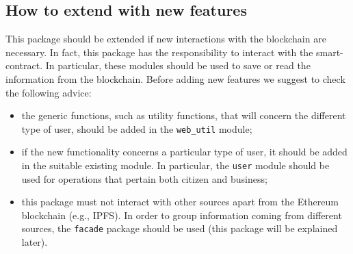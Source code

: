 \subsection{How to extend with new features}
This package should be extended if new interactions with the blockchain are necessary. In fact, this package has the responsibility to interact with the smart-contract. In particular, these modules should be used to save or read the information from the blockchain. Before adding new features we suggest to check the following advice:
\begin{itemize}
	\item the generic functions, such as utility functions, that will concern the different type of user, should be added in the \texttt{web\_util} module;
	\item if the new functionality concerns a particular type of user, it should be added in the suitable existing module. In particular, the \texttt{user} module should be used for operations that pertain both citizen and business;
	\item this package must not interact with other sources apart from the Ethereum blockchain (e.g., IPFS). In order to group information coming from different sources, the \texttt{facade} package should be used (this package will be explained later).
\end{itemize} 


